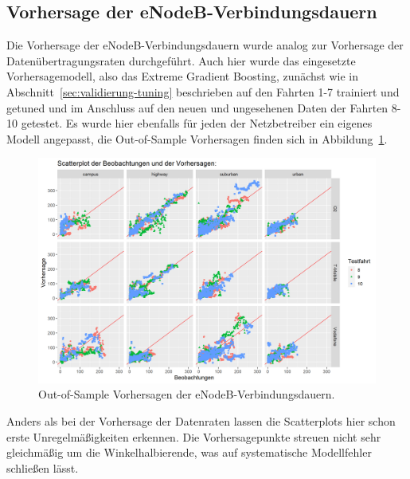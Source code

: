 \subsection{Vorhersage der eNodeB-Verbindungsdauern}

Die Vorhersage der eNodeB-Verbindungsdauern wurde analog zur Vorhersage der Daten\"ubertragungsraten durchgef\"uhrt.
Auch hier wurde das eingesetzte Vorhersagemodell, also das Extreme Gradient Boosting, zun\"achst wie in
Abschnitt~\ref{sec:validierung-tuning} beschrieben auf den Fahrten \mbox{1-7} trainiert und getuned und im Anschluss
auf den neuen und ungesehenen Daten der Fahrten \mbox{8-10} getestet.
Es wurde hier ebenfalls f\"ur jeden der Netzbetreiber ein eigenes Modell angepasst, 
die Out-of-Sample Vorhersagen finden sich in Abbildung~\ref{fig:link-lifetime-predictions}.
\begin{figure}
    \centering
    \includegraphics[width=\textwidth]{abbildungen/predictions_linklifetime}
    \caption{Out-of-Sample Vorhersagen der eNodeB-Verbindungsdauern.}
    \label{fig:link-lifetime-predictions}
\end{figure}
Anders als bei der Vorhersage der Datenraten lassen die Scatterplots hier schon erste Unregelm\"a{\ss}igkeiten erkennen.
Die Vorhersagepunkte streuen nicht sehr gleichm\"a{\ss}ig um die Winkelhalbierende, was auf systematische Modellfehler schlie{\ss}en
l\"asst.

